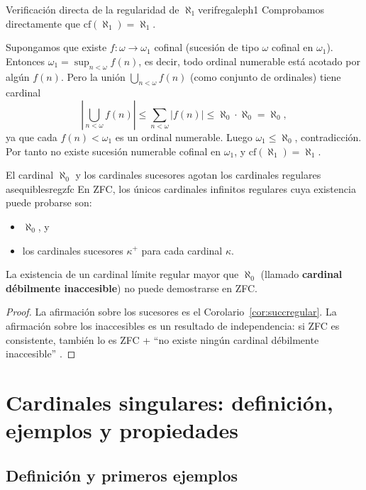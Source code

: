 \begin{ejemplo}{Verificación directa de la regularidad de $\aleph_1$}{verifregaleph1}
Comprobamos directamente que $\mathrm{cf}(\aleph_1) = \aleph_1$.

Supongamos que existe $f \colon \omega \to \omega_1$ cofinal (sucesión de tipo $\omega$ cofinal en $\omega_1$). Entonces $\omega_1 = \sup_{n<\omega} f(n)$, es decir, todo ordinal numerable está acotado por algún $f(n)$. Pero la unión $\bigcup_{n<\omega} f(n)$ (como conjunto de ordinales) tiene cardinal
\[
  \left|\bigcup_{n < \omega} f(n)\right| \leq \sum_{n<\omega} |f(n)| \leq \aleph_0 \cdot \aleph_0 = \aleph_0,
\]
ya que cada $f(n) < \omega_1$ es un ordinal numerable. Luego $\omega_1 \leq \aleph_0$, contradicción. Por tanto no existe sucesión numerable cofinal en $\omega_1$, y $\mathrm{cf}(\aleph_1) = \aleph_1$.
\end{ejemplo}

\begin{teorema}{El cardinal $\aleph_0$ y los cardinales sucesores agotan los cardinales regulares asequibles}{regzfc}
En ZFC, los únicos cardinales infinitos regulares cuya existencia puede probarse son:
\begin{itemize}[leftmargin=2em]
  \item $\aleph_0$, y
  \item los cardinales sucesores $\kappa^+$ para cada cardinal $\kappa$.
\end{itemize}
La existencia de un cardinal límite regular mayor que $\aleph_0$ (llamado \textbf{cardinal débilmente inaccesible}) no puede demostrarse en ZFC.
\end{teorema}

\begin{proof}
La afirmación sobre los sucesores es el Corolario~\ref{cor:succregular}. La afirmación sobre los inaccesibles es un resultado de independencia: si ZFC es consistente, también lo es ZFC + ``no existe ningún cardinal débilmente inaccesible'' \cite{godel1940, jech2003, kanamori2003}.
\end{proof}

\section{Cardinales singulares: definición, ejemplos y propiedades}
\label{sec:cardinales-singulares}

\subsection{Definición y primeros ejemplos}

